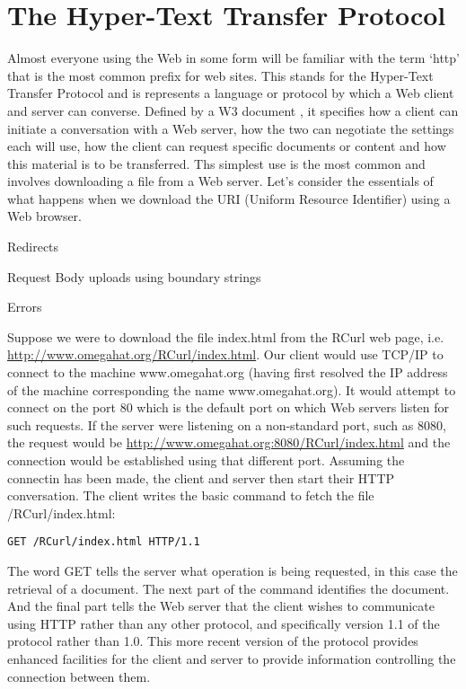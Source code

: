 \documentclass{article}
\begin{document}
\section{The Hyper-Text Transfer Protocol}\label{HTTPOverview}

Almost everyone using the Web in some form will be familiar with the
term `http' that is the most common prefix for web sites.  This stands
for the Hyper-Text Transfer Protocol and is represents a language or
protocol by which a Web client and server can converse.  Defined by a
W3 document \cite{HTTPSpec}, it specifies how a client can initiate a
conversation with a Web server, how the two can negotiate the settings
each will use, how the client can request specific documents or
content and how this material is to be transferred.  Ths simplest use
is the most common and involves downloading a file from a Web server.
Let's consider the essentials of what happens when we download the URI
(Uniform Resource Identifier) using a Web browser.


Redirects
 

Request Body 
 uploads using boundary strings

Errors


Suppose we were to download the file index.html from the RCurl web
page, i.e.  \url{http://www.omegahat.org/RCurl/index.html}.  Our
client would use TCP/IP to connect to the machine www.omegahat.org
(having first resolved the IP address of the machine corresponding the
name www.omegahat.org). It would attempt to connect on the port 80
which is the default port on which Web servers listen for such
requests.  If the server were listening on a non-standard port, such
as 8080, the request would be
\url{http://www.omegahat.org:8080/RCurl/index.html} and the connection
would be established using that different port.
Assuming the connectin has been made, the client and server
then start their HTTP conversation.
The client writes the basic command to fetch the file
/RCurl/index.html:
\begin{verbatim}
GET /RCurl/index.html HTTP/1.1 
\end{verbatim}
The word GET tells the server what operation is being requested, in
this case the retrieval of a document.  The next part of the command
identifies the document.  And the final part tells the Web server that
the client wishes to communicate using HTTP rather than any other
protocol, and specifically version 1.1 of the protocol rather than
1.0.  This more recent version of the protocol provides enhanced
facilities for the client and server to provide information
controlling the connection between them.
\end{document}
